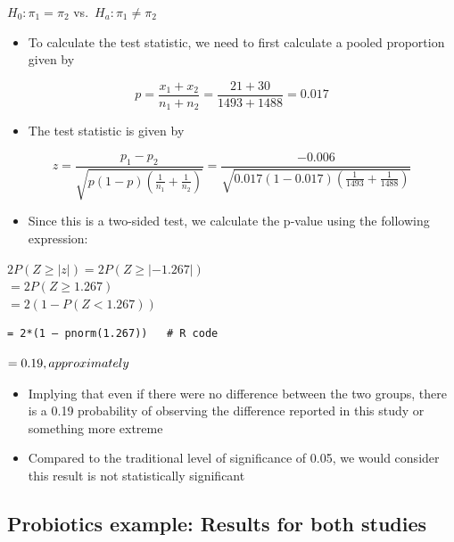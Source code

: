 \documentclass[
]{book}
\providecommand{\tightlist}{%
  \setlength{\itemsep}{0pt}\setlength{\parskip}{0pt}}
\begin{document}
\(H_0:\pi_1=\pi_2\) vs.~\(H_a:\pi_1\neq\pi_2\)

\begin{itemize}
\tightlist
\item
  To calculate the test statistic, we need to first calculate a pooled proportion given by
\end{itemize}

\[p=\frac{x_1+x_2}{n_1+n_2}=\frac{21+30}{1493+1488}=0.017\]

\begin{itemize}
\tightlist
\item
  The test statistic is given by
\end{itemize}

\[z=\frac{p_1-p_2}{\sqrt{p(1-p)\left(\frac{1}{n_1}+\frac{1}{n_2}\right)}}=\frac{-0.006}{\sqrt{0.017(1-0.017)\left(\frac{1}{1493}+\frac{1}{1488}\right)}}\]

\begin{itemize}
\tightlist
\item
  Since this is a two-sided test, we calculate the p-value using the following expression:
\end{itemize}

\(2P(Z\geq|z|)=2P(Z\geq|-1.267|)\)\\
\(=2P(Z\geq1.267)\)\\
\(=2(1-P(Z<1.267))\)

\begin{verbatim}
= 2*(1 – pnorm(1.267))   # R code 
\end{verbatim}

\(= 0.19,\space approximately\)

\begin{itemize}
\tightlist
\item
  Implying that even if there were no difference between the two groups, there is a 0.19 probability of observing the difference reported in this study or something more extreme
\item
  Compared to the traditional level of significance of 0.05, we would consider this result is not statistically significant
\end{itemize}

\hypertarget{probiotics-example-results-for-both-studies}{%
\subsection{Probiotics example: Results for both studies}\label{probiotics-example-results-for-both-studies}}
\end{document}
